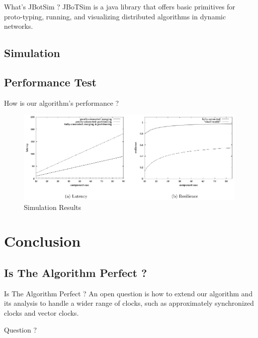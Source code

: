 \documentclass{beamer}
\begin{document}
\begin{frame}{What's JBotSim ?}
JBoTSim is a java library that offers basic primitives for proto-typing, running, and visualizing distributed algorithms in dynamic networks.
\end{frame}

\subsection{Simulation}
\begin{frame}


\end{frame}

\subsection{Performance Test}
\begin{frame}{How is our algorithm's performance ?}
	\begin{figure}
		\centering
		\includegraphics[width=1\linewidth]{performance_test}
		\caption{Simulation Results}
		\label{fig:performancetest}
	\end{figure}
	
\end{frame}

\section{Conclusion}
\subsection{Is The Algorithm Perfect ?}
\begin{frame}{Is The Algorithm Perfect ?}
 An open question is how to extend our algorithm and its analysis to handle a wider range of clocks, such as approximately synchronized clocks and vector clocks.
\end{frame}

\begin{frame}{Question ?}
	
\end{frame}
\end{document}

